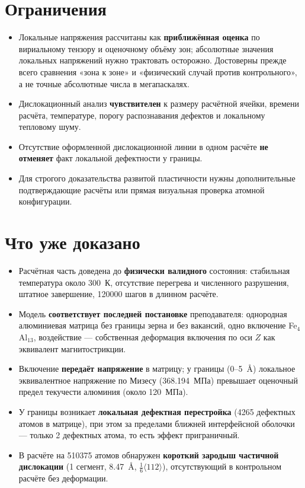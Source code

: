 \documentclass[12pt,a4paper]{extarticle}
\begin{document}
\section{Ограничения}
\begin{itemize}[leftmargin=1.4em,itemsep=2pt,topsep=2pt]
\item Локальные напряжения рассчитаны как \textbf{приближённая оценка} по вириальному тензору и оценочному объёму зон; абсолютные значения локальных напряжений нужно трактовать осторожно. Достоверны прежде всего сравнения «зона к зоне» и «физический случай против контрольного», а не точные абсолютные числа в мегапаскалях.
\item Дислокационный анализ \textbf{чувствителен} к размеру расчётной ячейки, времени расчёта, температуре, порогу распознавания дефектов и локальному тепловому шуму.
\item Отсутствие оформленной дислокационной линии в одном расчёте \textbf{не отменяет} факт локальной дефектности у границы.
\item Для строгого доказательства развитой пластичности нужны дополнительные подтверждающие расчёты или прямая визуальная проверка атомной конфигурации.
\end{itemize}

\section{Что уже доказано}
\begin{itemize}[leftmargin=1.4em,itemsep=2pt,topsep=2pt]
\item Расчётная часть доведена до \textbf{физически валидного} состояния: стабильная температура около 300~К, отсутствие перегрева и численного разрушения, штатное завершение, 120000 шагов в длинном расчёте.
\item Модель \textbf{соответствует последней постановке} преподавателя: однородная алюминиевая матрица без границы зерна и без вакансий, одно включение Fe$_4$Al$_{13}$, воздействие — собственная деформация включения по оси $Z$ как эквивалент магнитострикции.
\item Включение \textbf{передаёт напряжение} в матрицу; у границы (0--5~Å) локальное эквивалентное напряжение по Мизесу (368.194~МПа) превышает оценочный предел текучести алюминия (около 120~МПа).
\item У границы возникает \textbf{локальная дефектная перестройка} (4265 дефектных атомов в матрице), при этом за пределами ближней интерфейсной оболочки — только 2 дефектных атома, то есть эффект приграничный.
\item В расчёте на 510375 атомов обнаружен \textbf{короткий зародыш частичной дислокации} (1 сегмент, 8.47~Å, $\tfrac{1}{6}\langle 112\rangle$), отсутствующий в контрольном расчёте без деформации.
\end{itemize}
\end{document}
